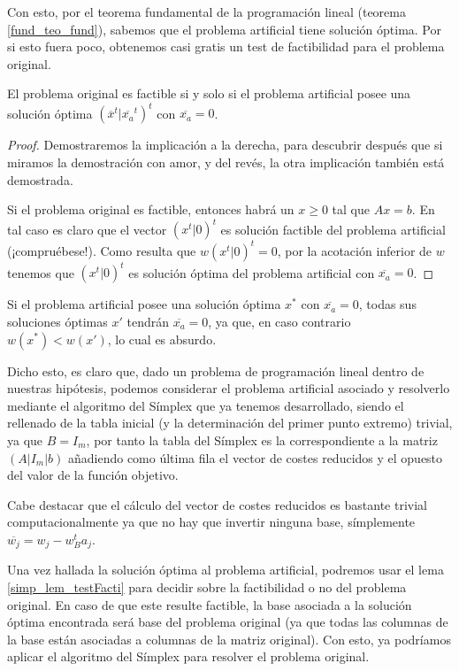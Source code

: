 Con esto, por el teorema fundamental de la programación lineal (teorema \ref{fund_teo_fund}), sabemos que el problema artificial tiene solución óptima. Por si esto fuera poco, obtenemos casi gratis un test de factibilidad para el problema original.
\begin{lem}
	\label{simp_lem_testFacti}
	El problema original es factible si y solo si el problema artificial posee una solución óptima $(\overline{x}^t|\overline{x_a}^t)^t$ con $\overline{x_a}=0$.
\end{lem}
\begin{proof}
	Demostraremos la implicación a la derecha, para descubrir después que si miramos la demostración con amor, y del revés, la otra implicación también está demostrada.
	
	Si el problema original es factible, entonces habrá un $x\geq 0$ tal que $Ax=b$. En tal caso es claro que el vector $(x^t|0)^t$ es solución factible del problema artificial (¡compruébese!). Como resulta que $w(x^t|0)^t=0$, por la acotación inferior de $w$ tenemos que $(x^t|0)^t$ es solución óptima del problema artificial con $\overline{x_a}=0$.
\end{proof}
\begin{obs}[Sutileza]
	Si el problema artificial posee una solución óptima $x^*$ con $\overline{x_a}=0$, todas sus soluciones óptimas $x'$ tendrán $\overline{x_a}=0$, ya que, en caso contrario $w(x^*)<w(x')$, lo cual es absurdo. 
\end{obs}
Dicho esto, es claro que, dado un problema de programación lineal dentro de nuestras hipótesis, podemos considerar el problema artificial asociado y resolverlo mediante el algoritmo del Símplex que ya tenemos desarrollado, siendo el rellenado de la tabla inicial (y la determinación del primer punto extremo) trivial, ya que $B=I_m$, por tanto la tabla del Símplex es la correspondiente a la matriz $(A|I_m|b)$ añadiendo como última fila el vector de costes reducidos y el opuesto del valor de la función objetivo.

Cabe destacar que el cálculo del vector de costes reducidos es bastante trivial computacionalmente ya que no hay que invertir ninguna base, símplemente $\overline{w_j}=w_j-w_B^ta_j$.

Una vez hallada la solución óptima al problema artificial, podremos usar el lema \ref{simp_lem_testFacti} para decidir sobre la factibilidad o no del problema original. En caso de que este resulte factible, la base asociada a la solución óptima encontrada será base del problema original (ya que todas las columnas de la base están asociadas a columnas de la matriz original). Con esto, ya podríamos aplicar el algoritmo del Símplex para resolver el problema original.


